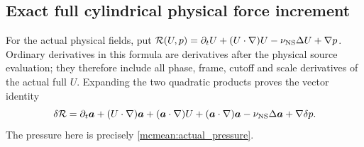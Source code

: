 \subsection{Exact full cylindrical physical force increment}

For the actual physical fields, put
\(\mathcal R(U,p)=\partial_tU+(U\cdot\nabla)U
-\nu_{\rm NS}\Delta U+\nabla p\). Ordinary derivatives in this
formula are derivatives after the physical source evaluation; they
therefore include all phase, frame, cutoff and scale derivatives of
the actual full \(U\). Expanding the two quadratic products proves
the vector identity
\begin{equation}\label{mcmean:vector_force}
 \delta\mathcal R=\partial_t\boldsymbol a
 +(U\cdot\nabla)\boldsymbol a+(\boldsymbol a\cdot\nabla)U
 +(\boldsymbol a\cdot\nabla)\boldsymbol a
 -\nu_{\rm NS}\Delta\boldsymbol a+\nabla\delta p.
\end{equation}
The pressure here is precisely \eqref{mcmean:actual_pressure}.


